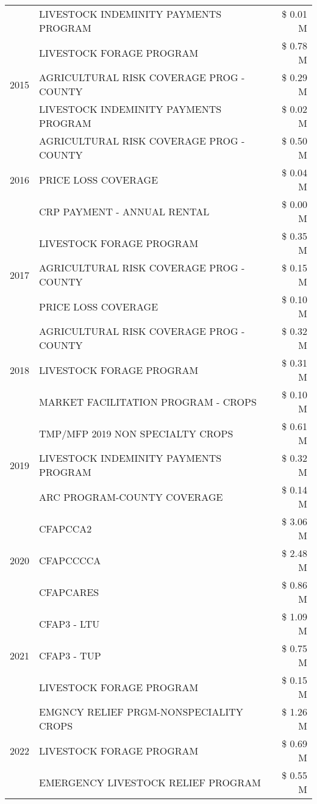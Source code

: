 \begin{tabular}{llr}
 & LIVESTOCK INDEMINITY PAYMENTS PROGRAM & \$ 0.01 M \\
\cline{1-3}
\multirow[t]{3}{*}{2015} & LIVESTOCK FORAGE PROGRAM & \$ 0.78 M \\
 & AGRICULTURAL RISK COVERAGE PROG - COUNTY & \$ 0.29 M \\
 & LIVESTOCK INDEMINITY PAYMENTS PROGRAM & \$ 0.02 M \\
\cline{1-3}
\multirow[t]{3}{*}{2016} & AGRICULTURAL RISK COVERAGE PROG - COUNTY & \$ 0.50 M \\
 & PRICE LOSS COVERAGE & \$ 0.04 M \\
 & CRP PAYMENT - ANNUAL RENTAL & \$ 0.00 M \\
\cline{1-3}
\multirow[t]{3}{*}{2017} & LIVESTOCK FORAGE PROGRAM & \$ 0.35 M \\
 & AGRICULTURAL RISK COVERAGE PROG - COUNTY & \$ 0.15 M \\
 & PRICE LOSS COVERAGE & \$ 0.10 M \\
\cline{1-3}
\multirow[t]{3}{*}{2018} & AGRICULTURAL RISK COVERAGE PROG - COUNTY & \$ 0.32 M \\
 & LIVESTOCK FORAGE PROGRAM & \$ 0.31 M \\
 & MARKET FACILITATION PROGRAM - CROPS & \$ 0.10 M \\
\cline{1-3}
\multirow[t]{3}{*}{2019} & TMP/MFP 2019 NON SPECIALTY CROPS & \$ 0.61 M \\
 & LIVESTOCK INDEMINITY PAYMENTS PROGRAM & \$ 0.32 M \\
 & ARC PROGRAM-COUNTY COVERAGE & \$ 0.14 M \\
\cline{1-3}
\multirow[t]{3}{*}{2020} & CFAPCCA2 & \$ 3.06 M \\
 & CFAPCCCCA & \$ 2.48 M \\
 & CFAPCARES & \$ 0.86 M \\
\cline{1-3}
\multirow[t]{3}{*}{2021} & CFAP3 - LTU & \$ 1.09 M \\
 & CFAP3 - TUP & \$ 0.75 M \\
 & LIVESTOCK FORAGE PROGRAM & \$ 0.15 M \\
\cline{1-3}
\multirow[t]{3}{*}{2022} & EMGNCY RELIEF PRGM-NONSPECIALITY CROPS & \$ 1.26 M \\
 & LIVESTOCK FORAGE PROGRAM & \$ 0.69 M \\
 & EMERGENCY LIVESTOCK RELIEF PROGRAM & \$ 0.55 M \\
\cline{1-3}
\bottomrule
\end{tabular}
